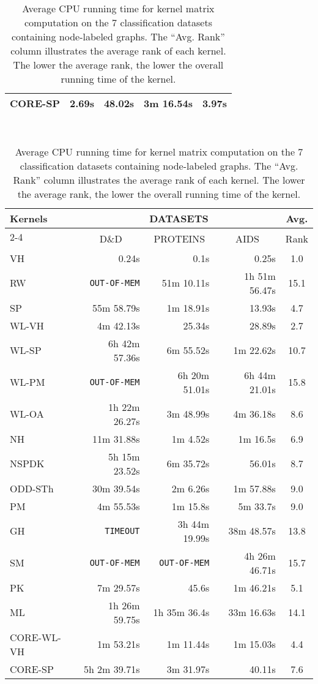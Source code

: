 \documentclass[twoside,11pt]{article}
\begin{document}
\begin{table}[t]
\begin{tabular}{lrrrr}
CORE-SP & 2.69s & 48.02s & 3m 16.54s & 3.97s \\
\bottomrule
\end{tabular}
\vspace{.2cm}
\\
\begin{tabular}{lrrrm{1.48cm}} \toprule
\multirow{3}{*}{Kernels} & \multicolumn{3}{c}{DATASETS} & \multicolumn{1}{c}{\multirow{2}{*}{Avg.}} \\ \cline{2-4}
& \multicolumn{1}{c}{\multirow{2}{*}{D\&D}} & \multicolumn{1}{c}{\multirow{2}{*}{PROTEINS}} & \multicolumn{1}{c}{\multirow{2}{*}{AIDS}} & \multicolumn{1}{c}{\multirow{2}{*}{Rank}} \\ 
& & & & \\
\midrule
VH & 0.24s & 0.1s & 0.25s & \multicolumn{1}{c}{1.0} \\ 
RW & \texttt{OUT-OF-MEM} & 51m 10.11s & 1h 51m 56.47s & \multicolumn{1}{c}{15.1} \\ 
SP & 55m 58.79s & 1m 18.91s & 13.93s & \multicolumn{1}{c}{4.7} \\ 
WL-VH & 4m 42.13s & 25.34s & 28.89s & \multicolumn{1}{c}{2.7} \\ 
WL-SP & 6h 42m 57.36s & 6m 55.52s & 1m 22.62s & \multicolumn{1}{c}{10.7} \\ 
WL-PM & \texttt{OUT-OF-MEM} & 6h 20m 51.01s & 6h 44m 21.01s & \multicolumn{1}{c}{15.8} \\ 
WL-OA & 1h 22m 26.27s & 3m 48.99s & 4m 36.18s & \multicolumn{1}{c}{8.6} \\ 
NH & 11m 31.88s & 1m 4.52s & 1m 16.5s & \multicolumn{1}{c}{6.9} \\ 
NSPDK & 5h 15m 23.52s & 6m 35.72s & 56.01s & \multicolumn{1}{c}{8.7} \\ 
ODD-STh & 30m 39.54s & 2m 6.26s & 1m 57.88s & \multicolumn{1}{c}{9.0} \\ 
PM & 4m 55.53s & 1m 15.8s & 5m 33.7s & \multicolumn{1}{c}{9.0} \\ 
GH & \texttt{TIMEOUT} & 3h 44m 19.99s & 38m 48.57s & \multicolumn{1}{c}{13.8} \\ 
SM & \texttt{OUT-OF-MEM} & \texttt{OUT-OF-MEM} & 4h 26m 46.71s & \multicolumn{1}{c}{15.7} \\ 
PK & 7m 29.57s & 45.6s & 1m 46.21s & \multicolumn{1}{c}{5.1} \\ 
ML & 1h 26m 59.75s & 1h 35m 36.4s & 33m 16.63s & \multicolumn{1}{c}{14.1} \\ 
CORE-WL-VH & 1m 53.21s & 1m 11.44s & 1m 15.03s & \multicolumn{1}{c}{4.4} \\ 
CORE-SP & 5h 2m 39.71s & 3m 31.97s & 40.11s & \multicolumn{1}{c}{7.6} \\ 
\bottomrule
\end{tabular}
\caption{Average CPU running time for kernel matrix computation on the $7$ classification datasets containing node-labeled graphs. The ``Avg. Rank'' column illustrates the average rank of each kernel. The lower the average rank, the lower the overall running time of the kernel.}
\label{tab:runtimes_labeled}
\end{table}
\end{document}
